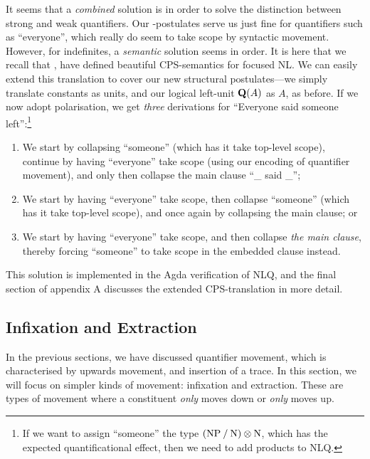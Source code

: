 It seems that a \emph{combined} solution is in order to solve the
distinction between strong and weak quantifiers. Our \I\B\C-postulates
serve us just fine for quantifiers such as ``everyone'', which really
do seem to take scope by syntactic movement. However, for indefinites,
a \emph{semantic} solution seems in order.
It is here that we recall that \citet{bastenhof2012},
\citet{moortgat2012} have defined beautiful CPS-semantics for focused
NL.
We can easily extend this translation to cover our new structural
postulates---we simply translate constants as units, and our logical
left-unit $\q[A]$ as $A$, as before. If we now adopt
 polarisation, we get \emph{three} derivations
for ``Everyone said someone left'':\footnote{%
  If we want to assign ``someone'' the type $(\NP\impl\N)\otimes\N$,
  which has the expected quantificational effect, then we need to add
  products to NLQ.
}
\begin{enumerate}
\item We start by collapsing ``someone'' (which has it take top-level
  scope), continue by having ``everyone'' take scope (using our
  encoding of quantifier movement), and only then collapse the main
  clause ``\_ said \_'';
\item We start by having ``everyone'' take scope, then collapse
  ``someone'' (which has it take top-level scope), and once again by
  collapsing the main clause; or
\item We start by having ``everyone'' take scope, and then collapse
  \emph{the main clause}, thereby forcing ``someone'' to take scope in
  the embedded clause instead.
\end{enumerate}
This solution is implemented in the Agda verification of NLQ, and the
final section of appendix A discusses the extended CPS-translation in
more detail.

\subsection{Infixation and Extraction}
In the previous sections, we have discussed quantifier movement, which
is characterised by upwards movement, and insertion of a trace. In
this section, we will focus on simpler kinds of movement: infixation
and extraction. These are types of movement where a constituent
\emph{only} moves down or \emph{only} moves up.

